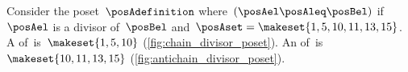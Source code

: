 \vspace{5cm}

\begin{marginfigure}
    \centering
    \caption{}
    \label{fig:chain_divisor_poset}
\end{marginfigure}

\begin{marginfigure}
    \centering
    \caption{}
    \label{fig:antichain_divisor_poset}
\end{marginfigure}

\begin{example}
    Consider the poset~$\posAdefinition$ where~$(\posAel \posAleq \posBel)$ if~$\posAel$ is a divisor of~$\posBel$ and~$\posAset=\makeset{1,5,10,11,13,15}$.
    A  of~\posA is~$\makeset{1,5,10}$ (\cref{fig:chain_divisor_poset}).
    An  of~\posA is~$\makeset{10,11,13,15}$ (\cref{fig:antichain_divisor_poset}).
\end{example}
